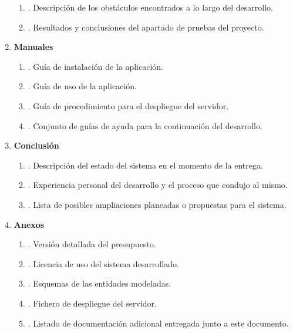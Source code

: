 \begin{enumerate}
\begin{enumerate}
    	\item \textbf{}. Descripción de los obstáculos encontrados a lo largo del desarrollo.
    	\item \textbf{}. Resultados y conclusiones del apartado de pruebas del proyecto.
	\end{enumerate}
    \item \textbf{Manuales}
    \begin{enumerate}
    	\item \textbf{}. Guía de instalación de la aplicación.
    	\item \textbf{}. Guía de uso de la aplicación.
    	\item \textbf{}. Guía de procedimiento para el despliegue del servidor.
    	\item \textbf{}. Conjunto de guías de ayuda para la continuación del desarrollo.
	\end{enumerate}
    \item \textbf{Conclusión}
    \begin{enumerate}
    	\item \textbf{}. Descripción del estado del sistema en el momento de la entrega.
    	\item \textbf{}. Experiencia personal del desarrollo y el proceso que condujo al mismo.
    	\item \textbf{}. Lista de posibles ampliaciones planeadas o propuestas para el sistema.
	\end{enumerate}
    \item \textbf{Anexos}
    \begin{enumerate}
    	\item \textbf{}. Versión detallada del presupuesto.
    	\item \textbf{}. Licencia de uso del sistema desarrollado.
    	\item \textbf{}. Esquemas de las entidades modeladas.
    	\item \textbf{}. Fichero de despliegue del servidor.
    	\item \textbf{}. Listado de documentación adicional entregada junto a este documento.
	\end{enumerate}
\end{enumerate}